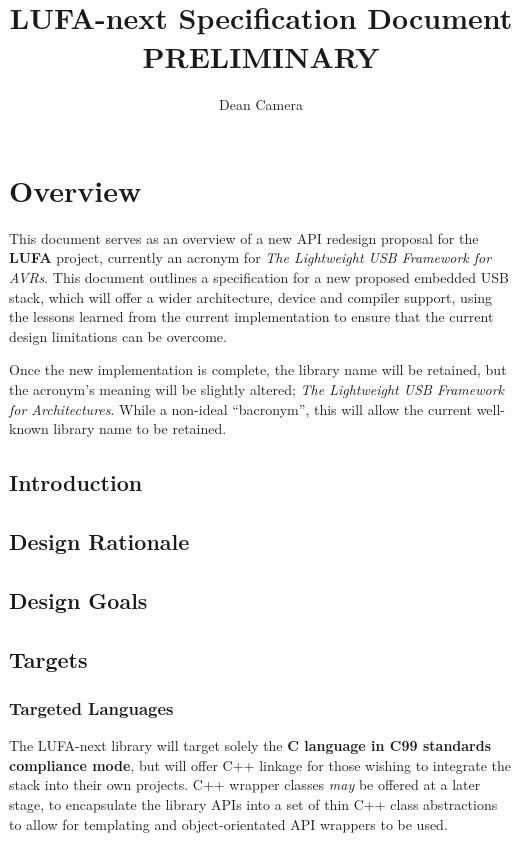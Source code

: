 \documentclass[a4paper,oneside,notitlepage]{book}
\begin{document}
\title{LUFA-next Specification Document \\ \color{red}PRELIMINARY}
\author{Dean Camera}

\maketitle

\tableofcontents
\cleardoublepage

\label{chp:Overview}
\chapter{Overview}
This document serves as an overview of a new API redesign proposal for the \textbf{LUFA} project, currently an acronym for \textit{The Lightweight USB Framework for AVRs}. This document outlines a specification for a new proposed embedded USB stack, which will offer a wider architecture, device and compiler support, using the lessons learned from the current implementation to ensure that the current design limitations can be overcome.

Once the new implementation is complete, the library name will be retained, but the acronym's meaning will be slightly altered; \textit{The Lightweight USB Framework for Architectures}. While a non-ideal ``bacronym'', this will allow the current well-known library name to be retained.

\section{Introduction}

\section{Design Rationale}

\section{Design Goals}

\section{Targets}

\subsection{Targeted Languages}
The LUFA-next library will target solely the \textbf{C language in C99 standards compliance mode}, but will offer C++ linkage for those wishing to integrate the stack into their own projects. C++ wrapper classes \textit{may} be offered at a later stage, to encapsulate the library APIs into a set of thin C++ class abstractions to allow for templating and object-orientated API wrappers to be used.
\end{document}
